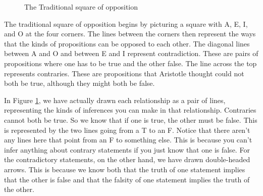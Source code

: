 \begin{figure}
\begin{mdframed}[style=mytablebox]
\begin{center}
\end{center}
\end{mdframed}
\caption{The Traditional square of opposition}
\label{fig:traditionalsquare}
\end{figure}

The traditional square of opposition begins by picturing a square with A, E, I, and O at the four corners. The lines between the corners then represent the ways that the kinds of propositions can be opposed to each other. The diagonal lines between A and O and between E and I represent contradiction. These are pairs of propositions where one has to be true and the other false. The line across the top represents contraries. These are propositions that Aristotle thought could not both be true, although they might both be false. 

In Figure \ref{fig:traditionalsquare}, we have actually drawn each relationship as a pair of lines, representing the kinds of inferences you can make in that relationship. Contraries cannot both be true. So we know that if one is true, the other must be false. This is represented by the two lines going from a T to an F. Notice that there aren't any lines here that point from an F to something else. This is because you can't infer anything about contrary statements if you just know that one is false. For the contradictory statements, on the other hand, we have drawn double-headed arrows. This is because we know both that the truth of one statement implies that the other is false and that the falsity of one statement implies the truth of the other. 

